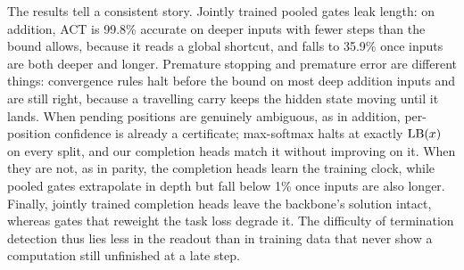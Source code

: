 The results tell a consistent story. Jointly trained pooled gates leak length: on addition, ACT is
99.8\% accurate on deeper inputs with fewer steps than the bound allows, because it reads a global
shortcut, and falls to 35.9\% once inputs are both deeper and longer. Premature stopping and premature
error are different things: convergence rules halt before the bound on most deep addition inputs and
are still right, because a travelling carry keeps the hidden state moving until it lands. When pending
positions are genuinely ambiguous, as in addition, per-position confidence is already a certificate;
max-softmax halts at exactly $\operatorname{LB}(x)$ on every split, and our completion heads match it without improving
on it. When they are not, as in parity, the completion heads learn the training clock, while pooled gates
extrapolate in depth but fall below 1\% once inputs are also longer. Finally, jointly trained completion
heads leave the backbone's solution intact, whereas gates that reweight the task loss degrade it. The
difficulty of termination detection thus lies less in the readout than in training data that never show
a computation still unfinished at a late step.
